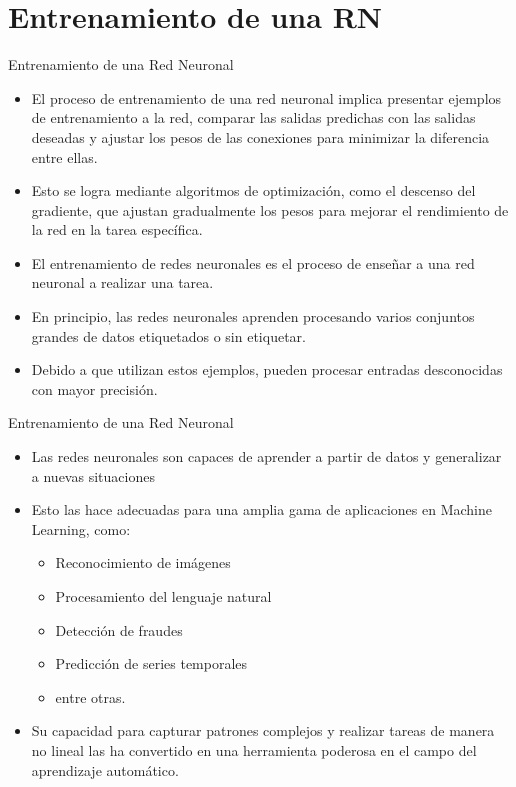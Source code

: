 \documentclass[11pt,aspectratio=169]{beamer}
\begin{document}
\section{Entrenamiento de una RN}
\begin{frame}{Entrenamiento de una Red Neuronal}
	\begin{itemize}
		\item El proceso de entrenamiento de una red neuronal implica presentar ejemplos de entrenamiento a la red, comparar las salidas 
			predichas con las salidas deseadas y ajustar los pesos de las conexiones para minimizar la diferencia entre ellas.\pause
		\item Esto se logra mediante algoritmos de optimización, como el descenso del gradiente, que ajustan gradualmente los pesos 
			para mejorar el rendimiento de la red en la tarea específica.\pause
		\item El entrenamiento de redes neuronales es el proceso de enseñar a una red neuronal a realizar una tarea.\pause 
		\item En principio, las redes neuronales aprenden procesando varios conjuntos grandes de datos etiquetados o sin etiquetar.\pause
		\item Debido a que utilizan estos ejemplos, pueden procesar entradas desconocidas con mayor precisión.
	\end{itemize}
\end{frame}

\begin{frame}{Entrenamiento de una Red Neuronal}
	\begin{itemize}
		\item Las redes neuronales son capaces de aprender a partir de datos y generalizar a nuevas situaciones\pause 
		\item Esto las hace adecuadas para una amplia gama de aplicaciones en Machine Learning, como:\pause
			\begin{itemize}
				\item Reconocimiento de imágenes \pause
				\item Procesamiento del lenguaje natural\pause
				\item Detección de fraudes\pause
				\item Predicción de series temporales \pause
				\item entre otras. \pause
			\end{itemize}
		\item Su capacidad para capturar patrones complejos y realizar tareas de manera no lineal las ha convertido en una herramienta 
		poderosa en el campo del aprendizaje automático.
	\end{itemize}
\end{frame}
\end{document}

